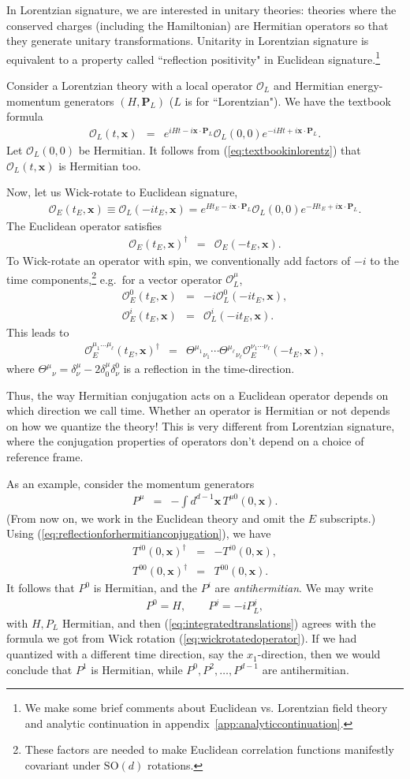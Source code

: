 \documentclass{ws-rv9x6}
\newcommand\be{\begin{eqnarray}}
\newcommand\ee{\end{eqnarray}}
\newcommand\cO{\mathcal{O}}
\newcommand\<\langle
\renewcommand\>\rangle
\newcommand\de\delta
\newcommand\bx{\mathbf{x}}
\newcommand\nn{\nonumber}
\renewcommand\.{\cdot}
\newcommand\SO{\mathrm{SO}}
\newcommand\bP{\mathbf{P}}
\begin{document}
In Lorentzian signature, we are interested in unitary theories: theories where the conserved charges (including the Hamiltonian) are Hermitian operators so that they generate unitary transformations.  Unitarity in Lorentzian signature is equivalent to a property called ``reflection positivity" in Euclidean signature.\footnote{We make some brief comments about Euclidean vs. Lorentzian field theory and analytic continuation in appendix~\ref{app:analyticcontinuation}.}

Consider a Lorentzian theory with a local operator $\cO_L$ and Hermitian energy-momentum generators $(H,\bP_L)$ ($L$ is for ``Lorentzian").  We have the textbook formula
\be
\label{eq:textbookinlorentz}
\cO_L(t,\bx) &=& e^{iHt-i\bx\.\bP_L}\cO_L(0,0)e^{-iHt+i\bx\.\bP_L}.
\ee
Let $\cO_L(0,0)$ be Hermitian.  It follows from (\ref{eq:textbookinlorentz}) that $\cO_L(t,\bx)$ is Hermitian too.

Now, let us Wick-rotate to Euclidean signature,
\be
\label{eq:wickrotatedoperator}
\cO_E(t_E,\bx) \equiv \cO_L(-it_E,\bx)
= e^{Ht_E-i\bx\.\bP_L}\cO_L(0,0)e^{-Ht_E+i\bx\.\bP_L}.
\ee
The Euclidean operator satisfies
\be
\cO_E(t_E,\bx)^\dag &=& \cO_E(-t_E,\bx).
\ee
To Wick-rotate an operator with spin, we conventionally add factors of $-i$ to the time components,\footnote{These factors are needed to make Euclidean correlation functions manifestly covariant under $\SO(d)$ rotations.} e.g.\ for a vector operator $\cO_L^\mu$,
\be
\cO_E^0(t_E,\bx) &=& -i \cO_L^0(-it_E,\bx),\nn\\
\cO_E^i(t_E,\bx) &=& \cO_L^i(-it_E,\bx).
\ee
This leads to
\be
\label{eq:reflectionforhermitianconjugation}
\cO_E^{\mu_1\dots\mu_\ell}(t_E,\bx)^\dag &=& \Theta^{\mu_1}{}_{\nu_1}\cdots \Theta^{\mu_\ell}{}_{\nu_\ell} \cO_E^{\nu_1\cdots\nu_\ell}(-t_E,\bx),
\ee
where $\Theta^\mu{}_\nu = \de^\mu_\nu-2\de^\mu_0\de_\nu^0$ is a reflection in the time-direction.

Thus, the way Hermitian conjugation acts on a Euclidean operator depends on which direction we call time.  Whether an operator is Hermitian or not depends on how we quantize the theory! This is very different from Lorentzian signature, where the conjugation properties of operators don't depend on a choice of reference frame.

As an example, consider the momentum generators
\be
P^\mu &=& -\int d^{d-1}\bx\, T^{\mu 0}(0,\bx).
\ee
(From now on, we work in the Euclidean theory and omit the $E$ subscripts.)
Using (\ref{eq:reflectionforhermitianconjugation}), we have
\be
T^{i 0}(0,\bx)^\dag &=& -T^{i0}(0,\bx),\nn\\
T^{00}(0,\bx)^\dag &=& T^{00}(0,\bx).
\ee
It follows that $P^0$ is Hermitian, and the $P^i$ are {\it antihermitian}.  We may write
\be
P^0 = H,\qquad
P^j = -iP^j_L,
\ee
with $H,P_L$ Hermitian, and then (\ref{eq:integratedtranslations}) agrees with the formula we got from Wick rotation (\ref{eq:wickrotatedoperator}).  If we had quantized with a different time direction, say the $x_1$-direction, then we would conclude that $P^1$ is Hermitian, while $P^0,P^2,\dots,P^{d-1}$ are antihermitian.
\end{document}

